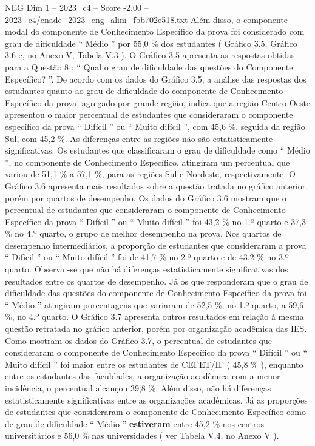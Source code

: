 \begin{textsample}{NEG Dim 1 – 2023\_c4 – Score -2.00 – 2023\_c4/enade\_2023\_eng\_alim\_fbb702e518.txt}
Além disso, o componente modal do componente de Conhecimento Específico da prova foi considerado com grau de dificuldade “ Médio ” por 55,0 \% dos estudantes ( Gráfico 3.5, Gráfico 3.6 e, no Anexo V, Tabela V.3 ).
O Gráfico 3.5 apresenta as respostas obtidas para a Questão 8 : “ Qual o grau de dificuldade das questões do Componente Específico? ”.
De acordo com os dados do Gráfico 3.5, a análise das respostas dos estudantes quanto ao grau de dificuldade do componente de Conhecimento Específico da prova, agregado por grande região, indica que a região Centro-Oeste apresentou o maior percentual de estudantes que consideraram o componente específico da prova “ Difícil ” ou “ Muito difícil ”, com 45,6 \%, seguida da região Sul, com 45,2 \%.
As diferenças entre as regiões não são estatisticamente significativas.
Os estudantes que classificaram o grau de dificuldade como “ Médio ”, no componente de Conhecimento Específico, atingiram um percentual que variou de 51,1 \% a 57,1 \%, para as regiões Sul e Nordeste, respectivamente.
O Gráfico 3.6 apresenta mais resultados sobre a questão tratada no gráfico anterior, porém por quartos de desempenho.
Os dados do Gráfico 3.6 mostram que o percentual de estudantes que consideraram o componente de Conhecimento Específico da prova “ Difícil ” ou “ Muito difícil ” foi 43,2 \% no 1.º quarto e 37,3 \% no 4.º quarto, o grupo de melhor desempenho na prova.
Nos quartos de desempenho intermediários, a proporção de estudantes que consideraram a prova “ Difícil ” ou “ Muito difícil ” foi de 41,7 \% no 2.º quarto e de 43,2 \% no 3.º quarto.
Observa -se que não há diferenças estatisticamente significativas dos resultados entre os quartos de desempenho.
Já os que responderam que o grau de dificuldade das questões do componente de Conhecimento Específico da prova foi “ Médio ” atingiram porcentagens que variaram de 52,5 \%, no 1.º quarto, a 59,6 \%, no 4.º quarto.
O Gráfico 3.7 apresenta outros resultados em relação à mesma questão retratada no gráfico anterior, porém por organização acadêmica das IES.
Como mostram os dados do Gráfico 3.7, o percentual de estudantes que consideraram o componente de Conhecimento Específico da prova “ Difícil ” ou “ Muito difícil ” foi maior entre os estudantes de CEFET/IF ( 45,8 \% ), enquanto entre os estudantes das faculdades, a organização acadêmica com a menor incidência, o percentual alcançou 39,8 \%.
Além disso, não há diferenças estatisticamente significativas entre as organizações acadêmicas.
Já as proporções de estudantes que consideraram o componente de Conhecimento Específico como de grau de dificuldade “ Médio ” \textbf{estiveram} entre 45,2 \% nos centros universitários e 56,0 \% nas universidades ( ver Tabela V.4, no Anexo V ).

\end{textsample}
